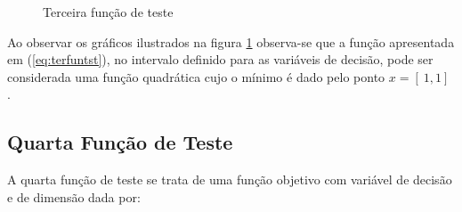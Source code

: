\begin{figure}[h!]
    \centering 
    \qquad
    \qquad
    \caption{Terceira função de teste}%
    \label{fig:terfun}%
\end{figure}
\FloatBarrier

Ao observar os gráficos ilustrados na figura \ref{fig:terfun} observa-se que a função apresentada em (\ref{eq:terfuntst}), no intervalo definido para as variáveis de decisão, pode ser considerada uma função quadrática cujo o mínimo é dado pelo ponto $x=[\ 1 , 1 ]\ $.

\subsection{Quarta Função de Teste}\label{sec:quafun}

A quarta função de teste se trata de uma função objetivo com variável de decisão e de dimensão	dada por:

